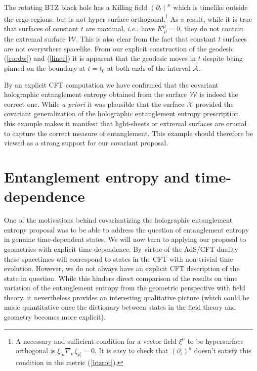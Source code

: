 \documentclass[12pt]{article}
\def\req#1{(\ref{#1})}
\def\({\left (}
\def\){\right )}
\def\ie{{\it i.e.}}
\def\p{\partial}
\def\CA{{\cal A}}
\def\CW{{\cal W}}
\def\CX{{\cal X}}
\def\p{\partial}
\def\p{\partial}
\def\Gms{\CW}
\def\Xms{\CX}
\def\rA{\CA}
\begin{document}
The rotating BTZ black hole has a Killing field $(\p_t)^\mu$ which is timelike outside the ergo-regions, but is not hyper-surface orthogonal.\footnote{A necessary and sufficient condition for  a vector field $\xi^\mu$ to be hypersurface orthogonal is $\xi_{[\mu}\nabla_{\!\nu}\,\xi_{\rho]} =0$. It is easy to check that $\(\p_t\)^\mu$ doesn't satisfy this condition in the metric \req{btzrot}.} As a result, while it is true that surfaces of constant $t$ are maximal, \ie, have $K^{\mu}_{\ \mu}= 0$, they do not contain the extremal surface $\Gms$. This is also clear from the fact that constant $t$ surfaces are not everywhere spacelike. From our explicit construction of the geodesic \req{cordw} and \req{linee} it is apparent that the geodesic moves in $t$ despite being pinned on the boundary at $t =t_0$ at both ends of the interval $\rA$.

By an explicit CFT computation we have confirmed that the covariant holographic entanglement entropy obtained from the surface $\Gms$ is indeed the correct one.
While {\it a priori} it was plausible that the surface $\Xms$ provided the covariant
generalization of the holographic entanglement entropy prescription, this example makes it manifest that light-sheets or extremal surfaces are crucial to capture the correct measure of entanglement. This example should therefore be viewed as a strong support for our covariant proposal.

\section{Entanglement entropy and time-dependence}
\label{timedep}
One of the motivations behind covariantizing the holographic
entanglement entropy proposal was to be able to address the question
of entanglement entropy in genuine time-dependent states. We will
now turn to applying our proposal to geometries with explicit
time-dependence. By virtue of the AdS/CFT duality these spacetimes
will correspond to states in the CFT with non-trivial time
evolution.  However, we do not always have an explicit CFT
description of the state in question. While this hinders direct
comparison of the results on time variation of the entanglement
entropy from the geometric perspective with field theory, it
nevertheless provides an interesting qualitative picture (which
could be made quantitative once the dictionary between states in the
field theory and geometry becomes more explicit).
\end{document}
